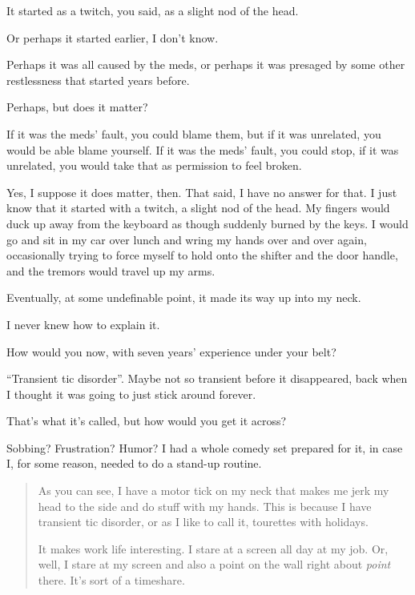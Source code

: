 \begin{paracol}{2}
\begin{leftcolumn}
\begin{ally}
It started as a twitch, you said, as a slight nod of the head.
\end{ally}
Or perhaps it started earlier, I don't know.

\begin{ally}
Perhaps it was all caused by the meds, or perhaps it was presaged by some other restlessness that started years before.
\end{ally}
Perhaps, but does it matter?

\begin{ally}
If it was the meds' fault, you could blame them, but if it was unrelated, you would be able blame yourself. If it was the meds' fault, you could stop, if it was unrelated, you would take that as permission to feel broken.
\end{ally}
Yes, I suppose it does matter, then. That said, I have no answer for that. I just know that it started with a twitch, a slight nod of the head. My fingers would duck up away from the keyboard as though suddenly burned by the keys. I would go and sit in my car over lunch and wring my hands over and over again, occasionally trying to force myself to hold onto the shifter and the door handle, and the tremors would travel up my arms.

Eventually, at some undefinable point, it made its way up into my neck.

I never knew how to explain it.

\begin{ally}
How would you now, with seven years' experience under your belt?
\end{ally}
``Transient tic disorder''. Maybe not so transient before it disappeared, back when I thought it was going to just stick around forever.

\begin{ally}
That's what it's called, but how would you get it across?
\end{ally}
Sobbing? Frustration? Humor? I had a whole comedy set prepared for it, in case I, for some reason, needed to do a stand-up routine.

\begin{quotation}
\noindent As you can see, I have a motor tick on my neck that makes me jerk my head to the side and do stuff with my hands. This is because I have transient tic disorder, or as I like to call it, tourettes with holidays.

It makes work life interesting. I stare at a screen all day at my job. Or, well, I stare at my screen and also a point on the wall right about \emph{point} there. It's sort of a timeshare.


\end{quotation}
\end{leftcolumn}
\end{paracol}
